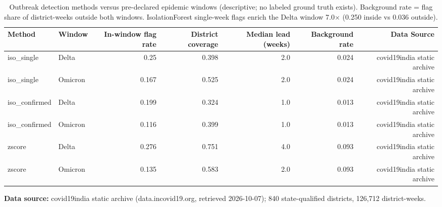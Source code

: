 \begin{table}[t]
\centering
\caption{Outbreak detection methods versus pre-declared epidemic windows (descriptive; no labeled ground truth exists). Background rate = flag share of district-weeks outside both windows. IsolationForest single-week flags enrich the Delta window 7.0$\times$ (0.250 inside vs 0.036 outside).}
\label{tab:outbreak}
\begin{adjustbox}{max width=0.98\textwidth}
\begin{tabular}{llrrrrr}
\toprule
Method & Window & In-window flag rate & District coverage & Median lead (weeks) & Background rate & Data Source \\
\midrule
iso\_single & Delta & 0.25 & 0.398 & 2.0 & 0.024 & covid19india static archive \\
iso\_single & Omicron & 0.167 & 0.525 & 2.0 & 0.024 & covid19india static archive \\
iso\_confirmed & Delta & 0.199 & 0.324 & 1.0 & 0.013 & covid19india static archive \\
iso\_confirmed & Omicron & 0.116 & 0.399 & 1.0 & 0.013 & covid19india static archive \\
zscore & Delta & 0.276 & 0.751 & 4.0 & 0.093 & covid19india static archive \\
zscore & Omicron & 0.135 & 0.583 & 2.0 & 0.093 & covid19india static archive \\
\bottomrule
\end{tabular}
\end{adjustbox}
\par\vspace{2pt}\raggedright\footnotesize \textbf{Data source:} covid19india static archive (data.incovid19.org, retrieved 2026-10-07); 840 state-qualified districts, 126,712 district-weeks.
\end{table}
